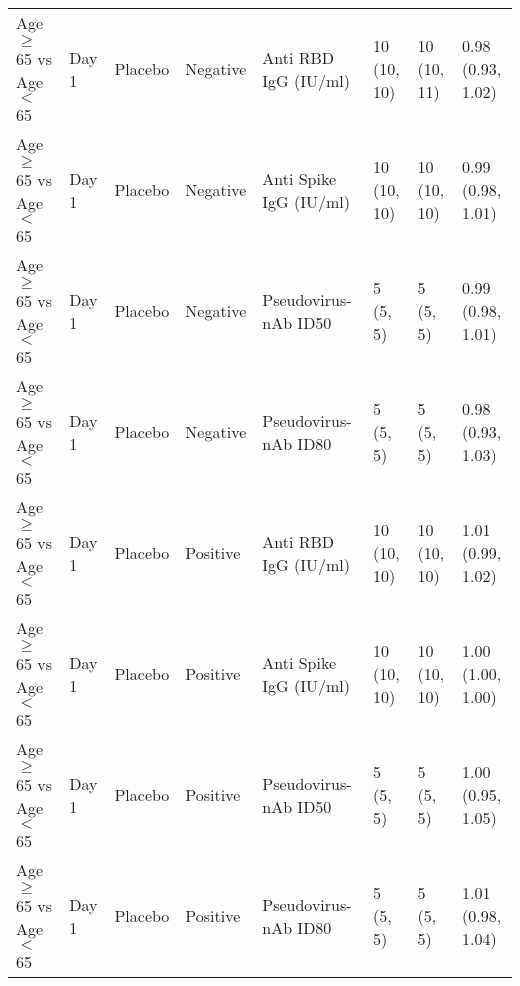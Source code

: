 \documentclass[]{book}
\theoremstyle{definition}
\theoremstyle{definition}
\theoremstyle{definition}
\newcommand{\1}{\mathbbm{1}}
\begin{document}
\begin{landscape}
\begin{ThreePartTable}
\begin{longtable}[t]{>{\raggedright\arraybackslash}p{2.7cm}lllllll}
Age $\geq$ 65 vs Age $<$ 65 & Day 1 & Placebo & Negative & Anti RBD IgG (IU/ml) & \makecell[l]{10\\(10, 10)} & \makecell[l]{10\\(10, 11)} & \makecell[l]{0.98\\(0.93, 1.02)}\\
Age $\geq$ 65 vs Age $<$ 65 & Day 1 & Placebo & Negative & Anti Spike IgG (IU/ml) & \makecell[l]{10\\(10, 10)} & \makecell[l]{10\\(10, 10)} & \makecell[l]{0.99\\(0.98, 1.01)}\\
\addlinespace
Age $\geq$ 65 vs Age $<$ 65 & Day 1 & Placebo & Negative & Pseudovirus-nAb ID50 & \makecell[l]{5\\(5, 5)} & \makecell[l]{5\\(5, 5)} & \makecell[l]{0.99\\(0.98, 1.01)}\\
Age $\geq$ 65 vs Age $<$ 65 & Day 1 & Placebo & Negative & Pseudovirus-nAb ID80 & \makecell[l]{5\\(5, 5)} & \makecell[l]{5\\(5, 5)} & \makecell[l]{0.98\\(0.93, 1.03)}\\
Age $\geq$ 65 vs Age $<$ 65 & Day 1 & Placebo & Positive & Anti RBD IgG (IU/ml) & \makecell[l]{10\\(10, 10)} & \makecell[l]{10\\(10, 10)} & \makecell[l]{1.01\\(0.99, 1.02)}\\
Age $\geq$ 65 vs Age $<$ 65 & Day 1 & Placebo & Positive & Anti Spike IgG (IU/ml) & \makecell[l]{10\\(10, 10)} & \makecell[l]{10\\(10, 10)} & \makecell[l]{1.00\\(1.00, 1.00)}\\
Age $\geq$ 65 vs Age $<$ 65 & Day 1 & Placebo & Positive & Pseudovirus-nAb ID50 & \makecell[l]{5\\(5, 5)} & \makecell[l]{5\\(5, 5)} & \makecell[l]{1.00\\(0.95, 1.05)}\\
\addlinespace
Age $\geq$ 65 vs Age $<$ 65 & Day 1 & Placebo & Positive & Pseudovirus-nAb ID80 & \makecell[l]{5\\(5, 5)} & \makecell[l]{5\\(5, 5)} & \makecell[l]{1.01\\(0.98, 1.04)}\\

\end{longtable}
\end{ThreePartTable}
\end{landscape}
\end{document}
